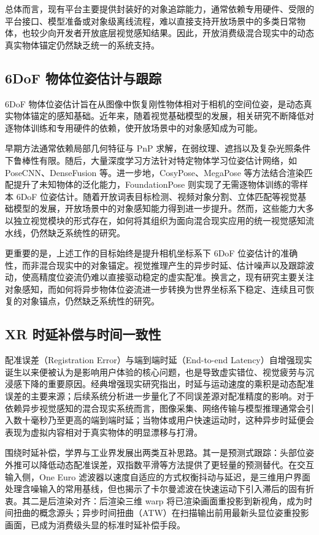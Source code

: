 \documentclass[review]{vgtc}
\begin{document}
总体而言，现有平台主要提供封装好的对象追踪能力，通常依赖专用硬件、受限的平台接口、模型准备或对象级离线流程，难以直接支持开放场景中的多类日常物体，也较少向开发者开放底层视觉感知结果。因此，开放消费级混合现实中的动态真实物体锚定仍然缺乏统一的系统支持。

\subsection{6DoF 物体位姿估计与跟踪}


6DoF 物体位姿估计旨在从图像中恢复刚性物体相对于相机的空间位姿，是动态真实物体锚定的感知基础。近年来，随着视觉基础模型的发展，相关研究不断降低对逐物体训练和专用硬件的依赖，使开放场景中的对象感知成为可能。

早期方法通常依赖局部几何特征与 PnP 求解，在弱纹理、遮挡以及复杂光照条件下鲁棒性有限。随后，大量深度学习方法针对特定物体学习位姿估计网络，如 PoseCNN、DenseFusion 等。进一步地，CosyPose、MegaPose 等方法结合渲染匹配提升了未知物体的泛化能力，FoundationPose 则实现了无需逐物体训练的零样本 6DoF 位姿估计。随着开放词表目标检测、视频对象分割、立体匹配等视觉基础模型的发展，开放场景中的对象感知能力得到进一步提升。然而，这些能力大多以独立视觉模块的形式存在，如何将其组织为面向混合现实应用的统一视觉感知流水线，仍然缺乏系统性的研究。

更重要的是，上述工作的目标始终是提升相机坐标系下 6DoF 位姿估计的准确性，而非混合现实中的对象锚定。视觉推理产生的异步时延、估计噪声以及跟踪波动，使高精度位姿流仍难以直接驱动稳定的虚实配准。换言之，现有研究主要关注对象感知，而如何将异步物体位姿流进一步转换为世界坐标系下稳定、连续且可恢复的对象锚点，仍然缺乏系统性的研究。

\subsection{XR 时延补偿与时间一致性}


配准误差（Registration Error）与端到端时延（End-to-end Latency）自增强现实诞生以来便被认为是影响用户体验的核心问题，也是导致虚实错位、视觉疲劳与沉浸感下降的重要原因。经典增强现实研究指出，时延与运动速度的乘积是动态配准误差的主要来源；后续系统分析进一步量化了不同误差源对配准精度的影响。对于依赖异步视觉感知的混合现实系统而言，图像采集、网络传输与模型推理通常会引入数十毫秒乃至更高的端到端时延；当物体或用户快速运动时，这种异步时延便会表现为虚拟内容相对于真实物体的明显漂移与打滑。

围绕时延补偿，学界与工业界发展出两类互补思路。其一是预测式跟踪：头部位姿外推可以降低动态配准误差，双指数平滑等方法提供了更轻量的预测替代。在交互输入侧，One Euro 滤波器以速度自适应的方式权衡抖动与延迟，是三维用户界面处理含噪输入的常用基线，但也揭示了卡尔曼滤波在快速运动下引入滞后的固有折衷。其二是后渲染对齐：后渲染三维 warp 将已渲染画面重投影到新视角，成为时间扭曲的概念源头；异步时间扭曲（ATW）在扫描输出前用最新头显位姿重投影画面，已成为消费级头显的标准时延补偿手段。
\end{document}
